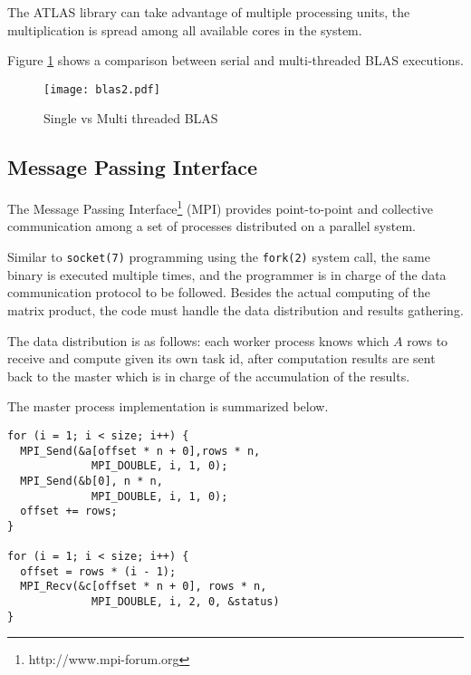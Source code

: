 \documentclass[a4paper,twocolumn]{article}
\begin{document}
The ATLAS library can take advantage of multiple processing units, the 
multiplication is spread among all available cores in the system.

\smallskip

Figure \ref{blas-comparison} shows a comparison between serial and 
multi-threaded BLAS executions.

\begin{center}
  \begin{figure}[H]
    \texttt{[image: blas2.pdf]}
    \caption{Single vs Multi threaded BLAS}
    \label{blas-comparison}
  \end{figure}
\end{center}

\subsection{Message Passing Interface}

The Message Passing Interface\footnote{http://www.mpi-forum.org} (MPI) 
provides point-to-point and collective communication among a set of processes 
distributed on a parallel system.

\smallskip

Similar to {\tt socket(7)} programming using the {\tt fork(2)} system call, 
the same binary is executed multiple times, and the programmer is in charge of
the data communication protocol to be followed. Besides the actual computing 
of the matrix product, the code must handle the data distribution and results 
gathering.

\smallskip

The data distribution is as follows: each worker process knows which $ A $ rows
to receive and compute given its own task id, after computation results are 
sent back to the master which is in charge of the accumulation of the results.

\smallskip

The master process implementation is summarized below.

\begin{verbatim}
for (i = 1; i < size; i++) {
  MPI_Send(&a[offset * n + 0],rows * n, 
             MPI_DOUBLE, i, 1, 0);
  MPI_Send(&b[0], n * n, 
             MPI_DOUBLE, i, 1, 0);
  offset += rows;
}
	      
for (i = 1; i < size; i++) {
  offset = rows * (i - 1);
  MPI_Recv(&c[offset * n + 0], rows * n, 
             MPI_DOUBLE, i, 2, 0, &status)
}
\end{verbatim}
\end{document}
